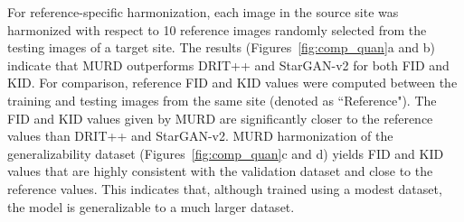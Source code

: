 \documentclass{nature}
\newcommand{\rev}[1]{\textcolor{red}{#1}}
\begin{document}
For reference-specific harmonization, each image in the source site was harmonized with respect to 10 reference images randomly selected from the testing images of a target site.
%
The results (Figures~\ref{fig:comp_quan}a and b) indicate that MURD outperforms DRIT++ and StarGAN-v2 for both FID and KID. For comparison, reference FID and KID values were computed between the training and testing images from the same site (denoted as ``Reference"). 
The FID and KID values given by MURD are significantly closer to the reference values than DRIT++ and StarGAN-v2. 
MURD harmonization of the generalizability dataset (Figures~\ref{fig:comp_quan}c and d) yields FID and KID values that are highly consistent with the validation dataset and  close to the reference values. This indicates that, although trained using a modest dataset, the model is generalizable to a much larger dataset.

\end{document}
